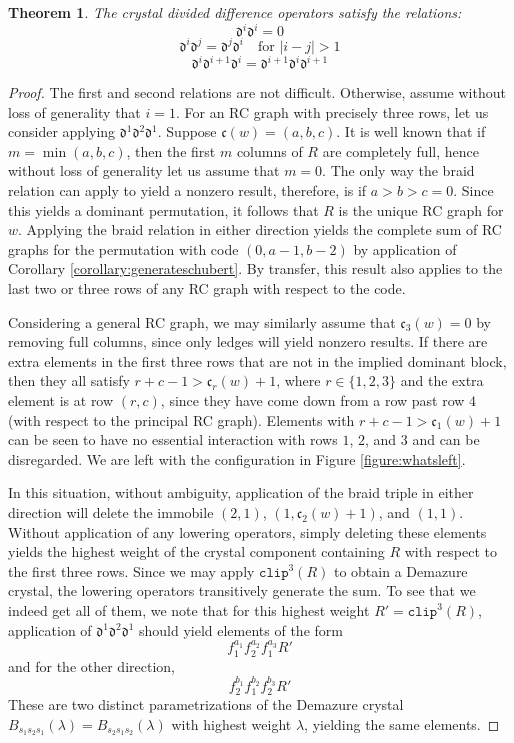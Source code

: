 \documentclass{amsart}
\newtheorem{theorem}{Theorem}[section]
\theoremstyle{definition}
\theoremstyle{remark}
\numberwithin{equation}{subsection}
\newcommand{\rcdd}{\mathfrak{d}}
\newcommand{\clp}{\mathtt{clip}}
\newcommand{\code}{\mathfrak{c}}
\begin{document}
\begin{theorem}
The crystal divided difference operators satisfy the relations:
$$\rcdd^i\rcdd^i = 0$$
$$\rcdd^i\rcdd^j = \rcdd^j\rcdd^i\quad\mbox{for }|i-j|>1$$
$$\rcdd^i\rcdd^{i+1}\rcdd^i = \rcdd^{i+1}\rcdd^i\rcdd^{i+1}$$
\end{theorem}

\begin{proof}
The first and second relations are not difficult. Otherwise, assume without loss of generality that $i=1$. For an RC graph with precisely three rows, let us consider applying $\rcdd^1\rcdd^2\rcdd^1$. Suppose $\code(w) = (a, b, c)$. It is well known that if $m=\min(a, b, c)$, then the first $m$ columns of $R$ are completely full, hence without loss of generality let us assume that $m=0$. The only way the braid relation can apply to yield a nonzero result, therefore, is if $a>b>c=0$. Since this yields a dominant permutation, it follows that $R$ is the unique RC graph for $w$. Applying the braid relation in either direction yields the complete sum of RC graphs for the permutation with code $(0, a - 1, b - 2)$ by application of Corollary \ref{corollary:generateschubert}. By transfer, this result also applies to the last two or three rows of any RC graph with respect to the code.

Considering a general RC graph, we may similarly assume that $\code_3(w)=0$ by removing full columns, since only ledges will yield nonzero results. If there are extra elements in the first three rows that are not in the implied dominant block, then they all satisfy $r + c - 1 > \code_r(w) + 1$, where $r\in \{1,2,3\}$ and the extra element is at row $(r,c)$, since they have come down from a row past row $4$ (with respect to the principal RC graph). Elements with $r + c - 1 > \code_1(w) + 1$ can be seen to have no essential interaction with rows $1$, $2$, and $3$ and can be disregarded. We are left with the configuration in Figure \ref{figure:whatsleft}.

In this situation, without ambiguity, application of the braid triple in either direction will delete the immobile $(2,1)$, $(1, \code_2(w) + 1)$, and $(1,1)$. Without application of any lowering operators, simply deleting these elements yields the highest weight of the crystal component containing $R$ with respect to the first three rows. Since we may apply $\clp^3(R)$ to obtain a Demazure crystal, the lowering operators transitively generate the sum. To see that we indeed get all of them, we note that for this highest weight $R' = \clp^3(R)$, application of $\rcdd^1\rcdd^2\rcdd^1$ should yield elements of the form
$$f_1^{a_1}f_2^{a_2}f_1^{a_3}R'$$
and for the other direction,
$$f_2^{b_1}f_1^{b_2}f_2^{b_3}R'$$
These are two distinct parametrizations of the Demazure crystal $B_{s_1s_2s_1}(\lambda)=B_{s_2s_1s_2}(\lambda)$ with highest weight $\lambda$, yielding the same elements.
\end{proof}
\end{document}
